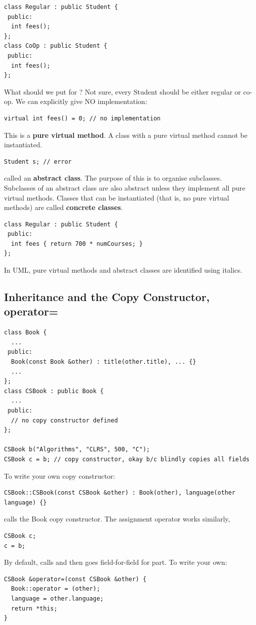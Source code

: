\documentclass[english, 11pt]{article}
\begin{document}
\begin{lstlisting}
class Regular : public Student {
 public:
  int fees();
};
class CoOp : public Student {
 public:
  int fees();
};
\end{lstlisting}

What should we put for ? Not sure, every Student should be either regular or co-op. We can explicitly give  NO implementation:

\begin{lstlisting}
virtual int fees() = 0; // no implementation
\end{lstlisting}

This is a \textbf{pure virtual method}. A class with a pure virtual method cannot be instantiated.
\begin{lstlisting}
Student s; // error
\end{lstlisting}
called an \textbf{abstract class}. The purpose of this is to organise subclasses. \\

Subclasses of an abstract class are also abstract unless they implement all pure virtual methods. Classes that can be instantiated (that is, no pure virtual methods) are called \textbf{concrete classes}.

\begin{lstlisting}
class Regular : public Student {
 public:
  int fees { return 700 * numCourses; }
};
\end{lstlisting}

In UML, pure virtual methods and abstract classes are identified using italics. \\

\subsection{Inheritance and the Copy Constructor, operator=}

\begin{lstlisting}
class Book {
  ...
 public:
  Book(const Book &other) : title(other.title), ... {}
  ...
};
class CSBook : public Book {
  ...
 public:
  // no copy constructor defined
};

CSBook b("Algorithms", "CLRS", 500, "C");
CSBook c = b; // copy constructor, okay b/c blindly copies all fields
\end{lstlisting}

To write your own copy constructor:
\begin{lstlisting}
CSBook::CSBook(const CSBook &other) : Book(other), language(other language) {}
\end{lstlisting}
calls the Book copy constructor. The assignment operator works similarly,
\begin{lstlisting}
CSBook c;
c = b;
\end{lstlisting}
By default, calls  and then goes field-for-field for  part. To write your own:
\begin{lstlisting}
CSBook &operator=(const CSBook &other) {
  Book::operator = (other);
  language = other.language;
  return *this;
}
\end{lstlisting}
\end{document}
